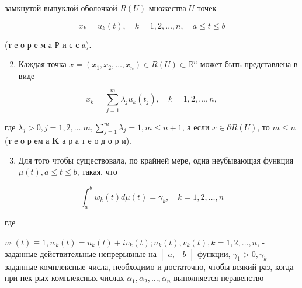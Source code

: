 \documentclass[10pt]{article}
\begin{document}
замкнутой выпуклой оболочкой $R(U)$ множества $U$ точек



\[

x_{k}=u_{k}(t), \quad k=1,2, \ldots, n, \quad a \leqslant t \leqslant b

\]



(т е о р е м а Р и с с a).



\begin{enumerate}

  \setcounter{enumi}{1}

  \item Каждая точка $x=\left(x_{1}, x_{2}, \ldots, x_{n}\right) \in R(U) \subset \mathbb{R}^{n}$ может быть представлена в виде

\end{enumerate}



\[

x_{k}=\sum_{j=1}^{m} \lambda_{j} u_{k}\left(t_{j}\right), \quad k=1,2, \ldots, n,

\]



где $\lambda_{j}>0, j=1,2, \ldots . m, \sum_{j=1}^{m} \lambda_{j}=1, m \leqslant n+1$, а если $x \in \partial R(U)$, то $m \leqslant n$ (т е о р ем а $\mathbf{K}$ а р а т е о д о р и).



\begin{enumerate}

  \setcounter{enumi}{2}

  \item Для того чтобы существовала, по крайней мере, одна неубывающая функция $\mu(t), a \leqslant t \leqslant b$, такая, что

\end{enumerate}



\[

\int_{a}^{b} w_{k}(t) d \mu(t)=\gamma_{k}, \quad k=1,2, \ldots, n

\]



где



$w_{1}(t) \equiv 1, w_{k}(t)=u_{k}(t)+i v_{k}(t) ; u_{k}(t), v_{k}(t), k=1,2, \ldots, n$, - заданные действительные непрерывные на $\left[\begin{array}{ll}a, & b\end{array}\right]$ функции, $\gamma_{1}>0, \gamma_{k}-$ заданные комплексные числа, необходимо и достаточно, чтобы всякий раз, когда при нек-рых комплексных числах $\alpha_{1}, \alpha_{2}, \ldots, \alpha_{n}$ выполняется неравенство
\end{document}
